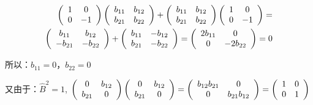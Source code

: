 \begin{eqnarray*}
\left( {\begin{array}{*{20}c}
   1 & 0  \\
   0 & { - 1}  \\
\end{array}} \right)\left( {\begin{array}{*{20}c}
   {b_{11} } & {b_{12} }  \\
   {b_{21} } & {b_{22} }  \\
\end{array}} \right) + \left( {\begin{array}{*{20}c}
   {b_{11} } & {b_{12} }  \\
   {b_{21} } & {b_{22} }  \\
\end{array}} \right)\left( {\begin{array}{*{20}c}
   1 & 0  \\
   0 & { - 1}  \\
\end{array}} \right) = \\
 \left( {\begin{array}{*{20}c}
   {b_{11} } & {b_{12} }  \\
   { - b_{21} } & { - b_{22} }  \\
\end{array}} \right) + \left( {\begin{array}{*{20}c}
   {b_{11} } & { - b_{12} }  \\
   {b_{21} } & { - b_{22} }  \\
\end{array}} \right) = \left( {\begin{array}{*{20}c}
   {2b_{11} } & 0  \\
   0 & { - 2b_{22} }  \\
\end{array}} \right) = 0
\end{eqnarray*}

所以：$b_{11}  = 0$，$b_{22}  = 0$


又由于：$\widehat B^2  = 1$, $\left( {\begin{array}{*{20}c}
   0 & {b_{12} }  \\
   {b_{21} } & 0  \\
\end{array}} \right)\left( {\begin{array}{*{20}c}
   0 & {b_{12} }  \\
   {b_{21} } & 0  \\
\end{array}} \right) = \left( {\begin{array}{*{20}c}
   {b_{12} b_{21} } & 0  \\
   0 & {b_{21} b_{12} }  \\
\end{array}} \right) = \left( {\begin{array}{*{20}c}
   1 & 0  \\
   0 & 1  \\
\end{array}} \right)$

